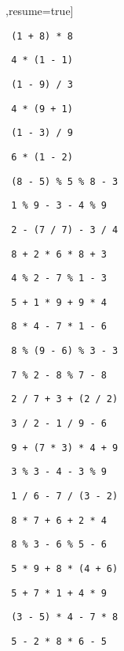 \begin{exercise}
\begin{sltasks}[counter-format=1.tsk[1],resume=true]
\begin{items}
        \item \texttt{ (1 + 8) * 8 }
    \end{items}
    \task
    \begin{items}
        \item \texttt{ 4 * (1 - 1) }
        \item \texttt{ (1 - 9) / 3 }
        \item \texttt{ 4 * (9 + 1) }
        \item \texttt{ (1 - 3) / 9 }
        \item \texttt{ 6 * (1 - 2) }
    \end{items}
    \task
    \begin{items}
        \item \texttt{ (8 - 5) \% 5 \% 8 - 3 }
        \item \texttt{ 1 \% 9 - 3 - 4 \% 9 }
        \item \texttt{ 2 - (7 / 7) - 3 / 4 }
        \item \texttt{ 8 + 2 * 6 * 8 + 3 }
        \item \texttt{ 4 \% 2 - 7 \% 1 - 3 }
    \end{items}
    \task
    \begin{items}
        \item \texttt{ 5 + 1 * 9 + 9 * 4 }
        \item \texttt{ 8 * 4 - 7 * 1 - 6 }
        \item \texttt{ 8 \% (9 - 6) \% 3 - 3 }
        \item \texttt{ 7 \% 2 - 8 \% 7 - 8 }
        \item \texttt{ 2 / 7 + 3 + (2 / 2) }
    \end{items}
    \task
    \begin{items}
        \item \texttt{ 3 / 2 - 1 / 9 - 6 }
        \item \texttt{ 9 + (7 * 3) * 4 + 9 }
        \item \texttt{ 3 \% 3 - 4 - 3 \% 9 }
        \item \texttt{ 1 / 6 - 7 / (3 - 2) }
        \item \texttt{ 8 * 7 + 6 + 2 * 4 }
    \end{items}
    \task
    \begin{items}
        \item \texttt{ 8 \% 3 - 6 \% 5 - 6 }
        \item \texttt{ 5 * 9 + 8 * (4 + 6) }
        \item \texttt{ 5 + 7 * 1 + 4 * 9 }
        \item \texttt{ (3 - 5) * 4 - 7 * 8 }
        \item \texttt{ 5 - 2 * 8 * 6 - 5 }
    \end{items}
\end{sltasks}
\end{exercise}

